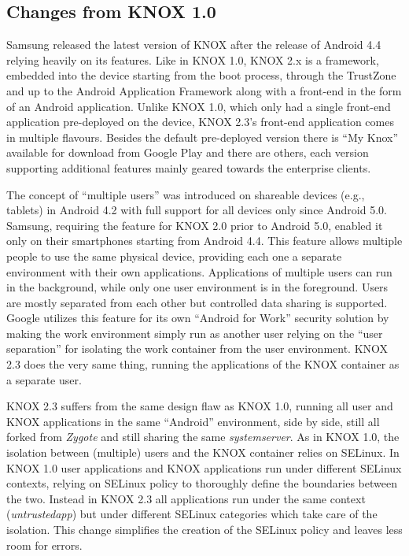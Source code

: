 \documentclass[11pt]{article}
\begin{document}
\subsection{Changes from KNOX 1.0}
Samsung released the latest version of KNOX \cite{AnOverviewOfSamsungKNOX2} after the release of Android 4.4 relying heavily on its features.
Like in KNOX 1.0, KNOX 2.x is a framework, embedded into the device starting from the boot process, through the TrustZone and up to the Android Application Framework along with a 
front-end in the form of an Android application.
Unlike KNOX 1.0, which only had a single front-end application pre-deployed on the device, KNOX 2.3's front-end application comes in multiple flavours. 
Besides the default pre-deployed version there is ``My Knox'' available for download from Google Play
and there are others, each version supporting additional features mainly geared towards the enterprise clients.

The concept of ``multiple users'' was introduced on shareable devices (e.g., tablets) in Android 4.2 with full support for all devices only since Android 5.0.
Samsung, requiring the feature for KNOX 2.0 prior to Android 5.0, enabled it only on their smartphones starting from Android 4.4.
This feature allows multiple people to use the same physical device, providing each one a separate environment 
with their own applications. Applications of multiple users can run in the background, while only one user environment is in the foreground. 
Users are mostly separated from each other but controlled data sharing is supported.
Google utilizes this feature for its own ``Android for Work'' \cite{AndroidForWorkSecurityWhitePaper} security solution by making the work environment 
simply run as another user relying on the ``user separation'' for isolating the work container from the user environment.
KNOX 2.3 does the very same thing, running the applications of the KNOX container as a separate user.

KNOX 2.3 suffers from the same design flaw as KNOX 1.0, running all user and KNOX applications in the same ``Android'' environment, 
side by side, still all forked from \emph{Zygote} and still sharing the same \emph{system\textunderscore server}.
As in KNOX 1.0, the isolation between (multiple) users and the KNOX container relies on SELinux. 
In KNOX 1.0 user applications and KNOX applications run under different SELinux contexts, relying on SELinux policy to thoroughly define the boundaries 
between the two. Instead in KNOX 2.3 all applications run under the same context (\emph{untrusted\textunderscore app}) but under different SELinux 
categories which take care of the isolation. This change simplifies the creation of the SELinux policy and leaves less room for errors.
\end{document}
